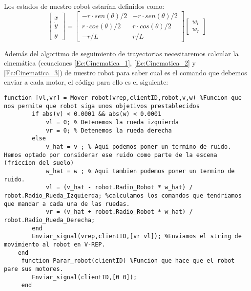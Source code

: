 Los estados de nuestro robot estarían definidos como:
\begin{equation} \label{Ec:Cinematica_3}
\begin{bmatrix}
    \dot{x} \\
    \dot{y} \\
    \dot{\theta} 
\end{bmatrix}
=
\begin{bmatrix}
    -r\cdot sen(\theta)/2 & -r\cdot sen(\theta)/2 \\
    r\cdot cos(\theta)/2 &  r\cdot cos(\theta)/2 \\
    -r/L &  r/L 
\end{bmatrix}
\begin{bmatrix}
	w_{l} \\
    w_{r} 
\end{bmatrix} 
\end{equation}

Además del algoritmo de seguimiento de trayectorias necesitaremos calcular la cinemática (ecuaciones \ref{Ec:Cinematica_1}, \ref{Ec:Cinematica_2} y \ref{Ec:Cinematica_3}) de nuestro robot para saber cual es el comando que debemos enviar a cada motor, el código para ello es el siguiente:
\begin{lstlisting}[frame=single]
function [vl,vr] = Mover_robot(vrep,clientID,robot,v,w) %Funcion que nos permite que robot siga unos objetivos prestablecidos
        if abs(v) < 0.0001 && abs(w) < 0.0001
            vl = 0; % Detenemos la rueda izquierda
            vr = 0; % Detenemos la rueda derecha
        else
            v_hat = v ; % Aqui podemos poner un termino de ruido. Hemos optado por considerar ese ruido como parte de la escena (friccion del suelo)
            w_hat = w ; % Aqui tambien podemos poner un termino de ruido.
            vl = (v_hat - robot.Radio_Robot * w_hat) / robot.Radio_Rueda_Izquierda; %calculamos los comandos que tendriamos que mandar a cada una de las ruedas.
            vr = (v_hat + robot.Radio_Robot * w_hat) / robot.Radio_Rueda_Derecha;   
        end 
        Enviar_signal(vrep,clientID,[vr vl]); %Enviamos el string de movimiento al robot en V-REP. 
    end
     function Parar_robot(clientID) %Funcion que hace que el robot pare sus motores.
        Enviar_signal(clientID,[0 0]);
     end
\end{lstlisting}

